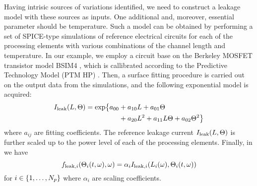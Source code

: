 Having intrisic sources of variations identified, we need to construct a leakage model with these sources as inputs. One additional and, moreover, essential parameter should be temperature. Such a model can be obtained by performing a set of SPICE-type simulations of reference electrical circuits for each of the processing elements with various combinations of the channel length and temperature. In our example, we employ a circuit base on the Berkeley MOSFET transistor model BSIM4 \cite{bsim4}, which is callibrated according to the Predictive Technology Model (PTM HP) \cite{ptm}. Then, a surface fitting procedure is carried out on the output data from the simulations, and the following exponential model is acquired:
\begin{align} \elabel{leakage-current}
  I_\leak(\Leff, \T) = \text{exp} \big\{ a_{00} & + a_{10} \Leff + a_{01} \T \\
  & {} + a_{20} \Leff^2 + a_{11} \Leff \T + a_{02} \T^2 \big\} \nonumber
\end{align}
where $a_{ij}$ are fitting coefficients. The reference leakage current $I_{\text{leak}}(L, \Theta)$ is further scaled up to the power level of each of the processing elements. Finally, in  we have
\[
  f_{\text{leak}, i}(\Theta_i(t, \omega), \omega) = \alpha_i I_{\text{leak}, i}(L_i(\omega), \Theta_i(t, \omega))
\]
for $i \in \{ 1, \dotsc, {N_p} \}$ where $\alpha_i$ are scaling coefficients.
